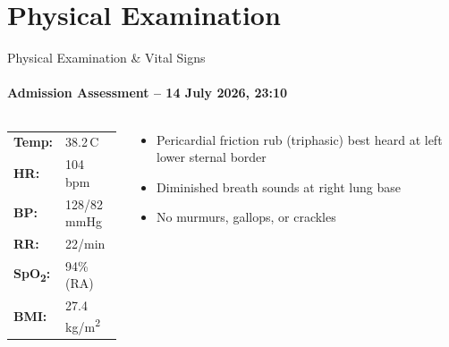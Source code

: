 \documentclass[10pt,aspectratio=169]{beamer}
\begin{document}
\section{Physical Examination}
\begin{frame}{Physical Examination \& Vital Signs}
  \framesubtitle{Admission Assessment -- 14 July 2026, 23:10}

  \begin{columns}[T]
    \begin{tcolorbox}[infobox,title={\faHeartbeat\hspace{4pt}Vital Signs}]
      \small
      \renewcommand{\arraystretch}{1.25}
      \begin{tabular}{@{}ll@{}}
        \textbf{Temp:}     & 38.2\,\textdegree{}C \\
        \textbf{HR:}       & 104 bpm \\
        \textbf{BP:}       & 128/82 mmHg \\
        \textbf{RR:}       & 22/min \\
        \textbf{SpO\textsubscript{2}:} & 94\% (RA) \\
        \textbf{BMI:}      & 27.4 kg/m\textsuperscript{2} \\
      \end{tabular}
    \end{tcolorbox}

    \vspace{0.2cm}

    \begin{tcolorbox}[highlightbox,title={\faStethoscope\hspace{4pt}Auscultation}]
      \small
      \begin{itemize}
        \item Pericardial friction rub (triphasic) best heard at left lower sternal border
        \item Diminished breath sounds at right lung base
        \item No murmurs, gallops, or crackles
      \end{itemize}
    \end{tcolorbox}


\end{columns}
\end{frame}
\end{document}
